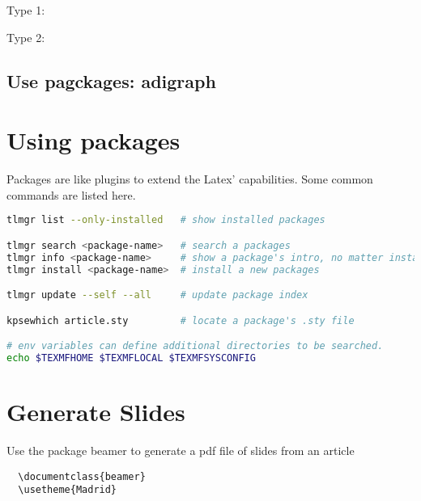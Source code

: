 \documentclass{article}   %
\begin{document}
  Type 1:


  Type 2:
  \iffalse
  \fi
  
 
  \subsection{Use pagckages: adigraph}

\myAdigraph{}

\newpage


\section{Using packages}
Packages are like plugins to extend the Latex' capabilities. Some common commands are listed here.

\begin{lstlisting}[language=bash, caption={tlmgr commands and etc}]
tlmgr list --only-installed   # show installed packages

tlmgr search <package-name>   # search a packages
tlmgr info <package-name>     # show a package's intro, no matter installed or not
tlmgr install <package-name>  # install a new packages

tlmgr update --self --all     # update package index

kpsewhich article.sty         # locate a package's .sty file

# env variables can define additional directories to be searched. 
echo $TEXMFHOME $TEXMFLOCAL $TEXMFSYSCONFIG 
\end{lstlisting}
\newpage


\section{Generate Slides}
Use the package beamer to generate a pdf file of slides from an article


\begin{lstlisting}[caption={Changes in .tex file}]
  % \documentclass{article}
  \documentclass{beamer}
  \usetheme{Madrid}
\end{lstlisting}

\end{document}
